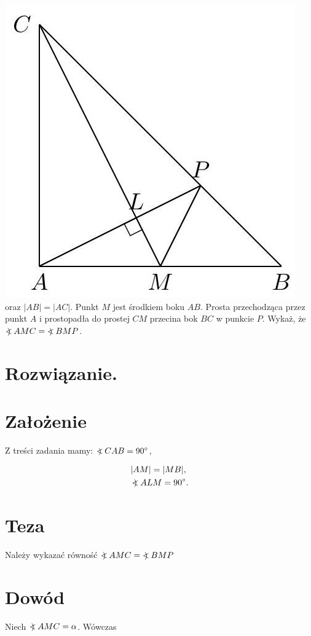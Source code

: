 \documentclass[10pt]{article}
\newcommand\Varangle{\mathop{{<\!\!\!\!\!\text{\small)}}\:}\nolimits}
\begin{document}
\includegraphics[max width=\textwidth, center]{2024_11_21_71f62bd117d375398909g-056(1)}\\
oraz \(|A B|=|A C|\). Punkt \(M\) jest środkiem boku \(A B\). Prosta przechodząca przez punkt \(A\) i prostopadła do prostej \(C M\) przecina bok \(B C\) w punkcie \(P\). Wykaż, że \(\Varangle A M C=\Varangle B M P\).

\section*{Rozwiązanie.}
\section*{Założenie}
Z treści zadania mamy: \(\Varangle C A B=90^{\circ}\),

\[
\begin{aligned}
& |A M|=|M B|, \\
& \Varangle A L M=90^{\circ} .
\end{aligned}
\]

\section*{Teza}
Należy wykazać równość \(\Varangle A M C=\Varangle B M P\)

\section*{Dowód}
Niech \(\Varangle A M C=\alpha\). Wówczas
\end{document}
